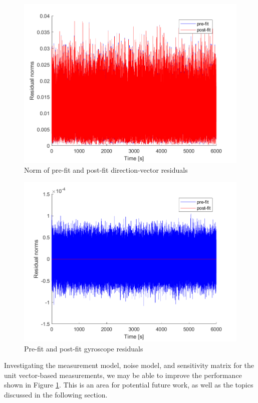 \begin{figure}[H]
\centering
\includegraphics[scale=0.8]{Images/ps8_problem7_res_units.png}
\caption{Norm of pre-fit and post-fit direction-vector residuals}
\label{fig:ps8_problem7_res_units}
\end{figure}

\begin{figure}[H]
\centering
\includegraphics[scale=0.8]{Images/ps8_problem7_res_gyro.png}
\caption{Pre-fit and post-fit gyroscope residuals}
\label{fig:ps8_problem7_res_gyro}
\end{figure}

Investigating the measurement model, noise model, and sensitivity matrix for the unit vector-based measurements, we may be able to improve the performance shown in Figure \ref{fig:ps8_problem7_res_units}. This is an area for potential future work, as well as the topics discussed in the following section.